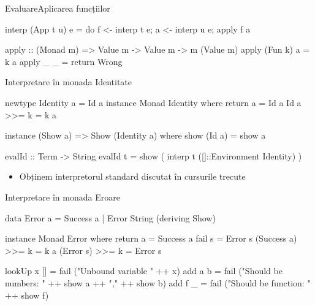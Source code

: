 \documentclass[xcolor=pdftex,romanian,colorlinks]{beamer}
\begin{document}
\begin{frame}[fragile]
{Evaluare}{Aplicarea funcțiilor}
\begin{asciihs}
interp (App t u) e = 
  do {
    f <- interp t e;
    a <- interp u e;
    apply f a
  }


apply :: (Monad m) => Value m -> Value m -> m (Value m)
apply (Fun k) a = k a
apply _ _ = return Wrong
\end{asciihs}
\end{frame}


\begin{frame}[fragile]{Interpretare în monada Identitate}
\begin{asciihs}
newtype Identity a = Id a
instance Monad Identity where
  return a   = Id a
  Id a >>= k = k a

instance (Show a) => Show (Identity a) where
  show (Id a) = show a

evalId :: Term -> String
evalId t = show ( interp t ([]::Environment Identity) )
\end{asciihs}
\begin{itemize}
\item Obținem interpretorul standard discutat în cursurile trecute
\end{itemize}
\end{frame}


\begin{frame}[fragile]{Interpretare în monada Eroare}
\begin{asciihs}
data Error a = Success a | Error String
  (deriving Show)

instance Monad Error where
  return a = Success a
  fail   s = Error s
  (Success a) >>= k = k a
  (Error s)   >>= k = Error s
  
  
lookUp x [] = fail ("Unbound variable " ++ x)
add a b   = fail ("Should be numbers: " ++ show a ++ 
                                    "," ++ show b)
add f _   = fail ("Should be function: " ++ show f)
\end{asciihs}
\end{frame}

\end{document}
